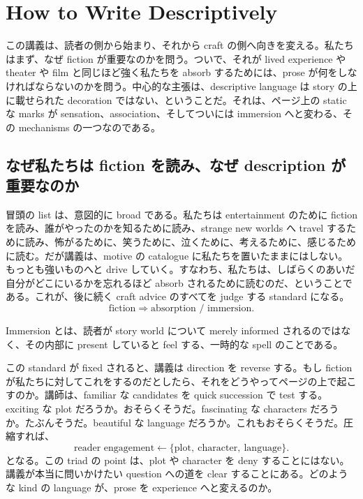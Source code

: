 \chapter{How to Write Descriptively}

この講義は、読者の側から始まり、それから craft の側へ向きを変える。私たちはまず、なぜ fiction が重要なのかを問う。ついで、それが lived experience や theater や film と同じほど強く私たちを absorb するためには、prose が何をしなければならないのかを問う。中心的な主張は、descriptive language は story の上に載せられた decoration ではない、ということだ。それは、ページ上の static な marks が sensation、association、そしてついには immersion へと変わる、その mechanisms の一つなのである。

\section{なぜ私たちは fiction を読み、なぜ description が重要なのか}

冒頭の list は、意図的に broad である。私たちは entertainment のために fiction を読み、誰がやったのかを知るために読み、strange new worlds へ travel するために読み、怖がるために、笑うために、泣くために、考えるために、感じるために読む。だが講義は、motive の catalogue に私たちを置いたままにはしない。もっとも強いものへと drive していく。すなわち、私たちは、しばらくのあいだ自分がどこにいるかを忘れるほど absorb されるために読むのだ、ということである。これが、後に続く craft advice のすべてを judge する standard になる。
\begin{equation}
\text{fiction} \Rightarrow \text{absorption / immersion}.
\end{equation}

\begin{definition}
Immersion とは、読者が story world について merely informed されるのではなく、その内部に present していると feel する、一時的な spell のことである。
\end{definition}

この standard が fixed されると、講義は direction を reverse する。もし fiction が私たちに対してこれをするのだとしたら、それをどうやってページの上で起こすのか。講師は、familiar な candidates を quick succession で test する。exciting な plot だろうか。おそらくそうだ。fascinating な characters だろうか。たぶんそうだ。beautiful な language だろうか。これもおそらくそうだ。圧縮すれば、
\begin{equation}
\text{reader engagement} \leftarrow \{\text{plot},\ \text{character},\ \text{language}\}.
\end{equation}
となる。この triad の point は、plot や character を deny することにはない。講義が本当に問いかけたい question への道を clear することにある。どのような kind の language が、prose を experience へと変えるのか。

